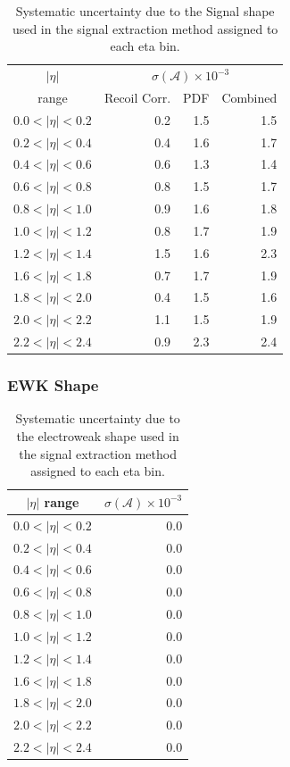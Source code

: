 \begin{table}[htbp]
\begin{center}
\begin{tabular}{crrr}
$|\eta|$  & \multicolumn{3}{c}{$\sigma(\mathcal{A}) \times 10^{-3}$}\\
range     & Recoil Corr.& PDF & Combined \\
\hline
$0.0<|\eta|<0.2$ &  0.2 &  1.5  & 1.5 \\
$0.2<|\eta|<0.4$ &  0.4 &  1.6  & 1.7 \\
$0.4<|\eta|<0.6$ &  0.6 &  1.3  & 1.4 \\
$0.6<|\eta|<0.8$ &  0.8 &  1.5  & 1.7 \\
$0.8<|\eta|<1.0$ &  0.9 &  1.6  & 1.8 \\
$1.0<|\eta|<1.2$ &  0.8 &  1.7  & 1.9 \\
$1.2<|\eta|<1.4$ &  1.5 &  1.6  & 2.3 \\
$1.6<|\eta|<1.8$ &  0.7 &  1.7  & 1.9 \\
$1.8<|\eta|<2.0$ &  0.4 &  1.5  & 1.6 \\
$2.0<|\eta|<2.2$ &  1.1 &  1.5  & 1.9 \\
$2.2<|\eta|<2.4$ &  0.9 &  2.3  & 2.4 \\
\end{tabular}
\caption{\label{tab:systSIG}Systematic uncertainty due to the Signal \MET shape
used in the signal extraction method assigned to each eta bin.}
\end{center}
\end{table}

\subsubsection{EWK \ETm Shape}

\begin{table}[htbp]
\begin{center}
\begin{tabular}{cr}
\hline
$|\eta|$ range & $\sigma(\mathcal{A}) \times 10^{-3}$\\
\hline
\hline
$0.0<|\eta|<0.2$ & 0.0\\
$0.2<|\eta|<0.4$ & 0.0\\
$0.4<|\eta|<0.6$ & 0.0\\
$0.6<|\eta|<0.8$ & 0.0\\
$0.8<|\eta|<1.0$ & 0.0\\
$1.0<|\eta|<1.2$ & 0.0\\
$1.2<|\eta|<1.4$ & 0.0\\
$1.6<|\eta|<1.8$ & 0.0\\
$1.8<|\eta|<2.0$ & 0.0\\
$2.0<|\eta|<2.2$ & 0.0\\
$2.2<|\eta|<2.4$ & 0.0\\
\hline
\end{tabular}
\caption{\label{tab:systEWK}Systematic uncertainty due to the electroweak \MET shape used in the signal extraction method assigned to each eta bin.}
\end{center}
\end{table}


